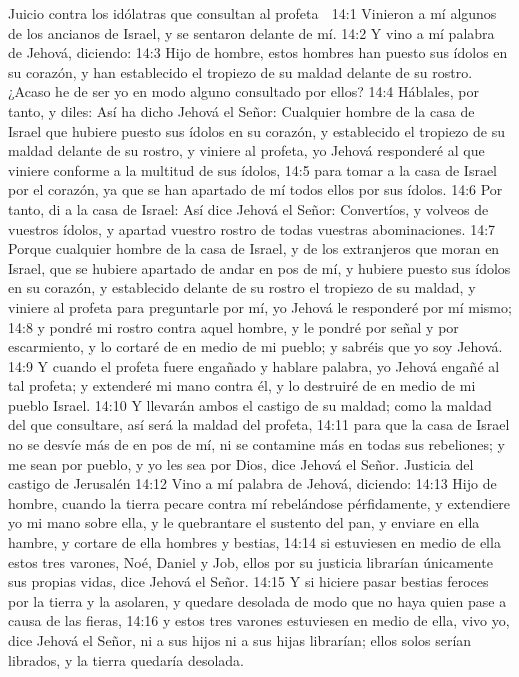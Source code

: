 Juicio contra los idólatras que consultan al profeta  

14:1 Vinieron a mí algunos de los ancianos de Israel, y se sentaron delante de mí.  
14:2 Y vino a mí palabra de Jehová, diciendo:  
14:3 Hijo de hombre, estos hombres han puesto sus ídolos en su corazón, y han establecido el tropiezo de su maldad delante de su rostro. ¿Acaso he de ser yo en modo alguno consultado por ellos?  
14:4 Háblales, por tanto, y diles: Así ha dicho Jehová el Señor: Cualquier hombre de la casa de Israel que hubiere puesto sus ídolos en su corazón, y establecido el tropiezo de su maldad delante de su rostro, y viniere al profeta, yo Jehová responderé al que viniere conforme a la multitud de sus ídolos,  
14:5 para tomar a la casa de Israel por el corazón, ya que se han apartado de mí todos ellos por sus ídolos.  
14:6 Por tanto, di a la casa de Israel: Así dice Jehová el Señor: Convertíos, y volveos de vuestros ídolos, y apartad vuestro rostro de todas vuestras abominaciones.  
14:7 Porque cualquier hombre de la casa de Israel, y de los extranjeros que moran en Israel, que se hubiere apartado de andar en pos de mí, y hubiere puesto sus ídolos en su corazón, y establecido delante de su rostro el tropiezo de su maldad, y viniere al profeta para preguntarle por mí, yo Jehová le responderé por mí mismo;  
14:8 y pondré mi rostro contra aquel hombre, y le pondré por señal y por escarmiento, y lo cortaré de en medio de mi pueblo; y sabréis que yo soy Jehová.  
14:9 Y cuando el profeta fuere engañado y hablare palabra, yo Jehová engañé al tal profeta; y extenderé mi mano contra él, y lo destruiré de en medio de mi pueblo Israel.  
14:10 Y llevarán ambos el castigo de su maldad; como la maldad del que consultare, así será la maldad del profeta,  
14:11 para que la casa de Israel no se desvíe más de en pos de mí, ni se contamine más en todas sus rebeliones; y me sean por pueblo, y yo les sea por Dios, dice Jehová el Señor.  
Justicia del castigo de Jerusalén  
14:12 Vino a mí palabra de Jehová, diciendo:  
14:13 Hijo de hombre, cuando la tierra pecare contra mí rebelándose pérfidamente, y extendiere yo mi mano sobre ella, y le quebrantare el sustento del pan, y enviare en ella hambre, y cortare de ella hombres y bestias,  
14:14 si estuviesen en medio de ella estos tres varones, Noé, Daniel y Job, ellos por su justicia librarían únicamente sus propias vidas, dice Jehová el Señor.  
14:15 Y si hiciere pasar bestias feroces por la tierra y la asolaren, y quedare desolada de modo que no haya quien pase a causa de las fieras,  
14:16 y estos tres varones estuviesen en medio de ella, vivo yo, dice Jehová el Señor, ni a sus hijos ni a sus hijas librarían; ellos solos serían librados, y la tierra quedaría desolada.  
